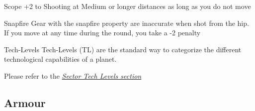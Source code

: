 \begin{multicols}{2}
\begin{genericsection}{Scope}
+2 to Shooting at Medium or longer distances as long as you do not move
\end{genericsection}

\begin{genericsection}{Snapfire}
Gear with the snapfire property are inaccurate when shot from the hip. If you move at any time during the round, you take a -2 penalty
\end{genericsection}

\begin{genericsection}{Tech-Levels}
Tech-Levels (TL) are the standard way to categorize the different technological capabilities of a planet. 

Please refer to the \textit{\hyperref[sec:sector-tech-levels]{Sector Tech Levels section}}
\end{genericsection}

\end{multicols}

\subsection{Armour}

